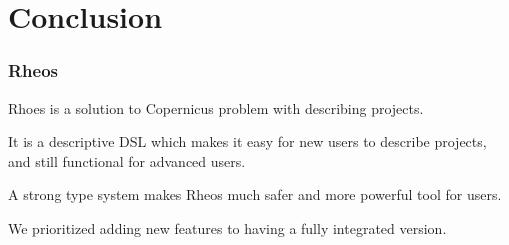 \section{Conclusion}

\begin{frame}
  \frametitle{Rheos}

  Rhoes is a solution to Copernicus problem with describing projects.

  \pause

  It is a descriptive DSL which makes it easy for new users to
  describe projects, and still functional for advanced users.

  \pause

  A strong type system makes Rheos much safer and more powerful tool
  for users.

  \pause

  We prioritized adding new features to having a fully integrated
  version.

\end{frame}
